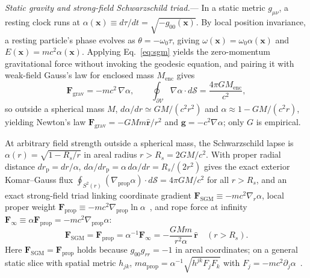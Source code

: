 \documentclass[aps,prl,reprint,superscriptaddress,nofootinbib,floatfix]{revtex4-2}
\theoremstyle{prlthm}
\newcommand{\prlsec}[1]{\par\smallskip\noindent\emph{#1.}---}
\begin{document}
\prlsec{Static gravity and strong-field Schwarzschild triad}
In a static metric $g_{\mu\nu}$, a resting clock runs at $\alpha(\mathbf{x})\equiv d\tau/dt=\sqrt{-g_{00}(\mathbf{x})}$. By local position invariance, a resting particle's phase evolves as $\theta=-\omega_0\tau$, giving $\omega(\mathbf{x})=\omega_0\alpha(\mathbf{x})$ and $E(\mathbf{x})=mc^2\alpha(\mathbf{x})$. Applying Eq.~\eqref{eq:sgm} yields the zero-momentum gravitational force without invoking the geodesic equation, and pairing it with weak-field Gauss's law for enclosed mass $M_\text{enc}$ gives
\begin{equation}
  \mathbf{F}_\text{grav}=-mc^2\,\nabla\alpha,\qquad \oint_{\partial\mathcal{V}}\nabla\alpha\cdot d\boldsymbol{\mathcal{S}}=\frac{4\pi GM_\text{enc}}{c^2},
  \label{eq:geometric_force}
\end{equation}
so outside a spherical mass $M$, $d\alpha/dr\simeq GM/(c^2 r^2)$ and $\alpha\approx 1-GM/(c^2 r)$, yielding Newton's law $\mathbf{F}_\text{grav}=-GMm\hat{\mathbf{r}}/r^2$ and $\mathbf{g}=-c^2\nabla\alpha$; only $G$ is empirical.

At arbitrary field strength outside a spherical mass, the Schwarzschild lapse is $\alpha(r)=\sqrt{1-R_s/r}$ in areal radius $r>R_s=2GM/c^2$. With proper radial distance $dr_\text{p}=dr/\alpha$, $d\alpha/dr_\text{p}=\alpha\,d\alpha/dr=R_s/(2r^2)$ gives the exact exterior Komar--Gauss flux $\oint_{S^2(r)}(\nabla_\text{prop}\alpha)\cdot d\boldsymbol{\mathcal{S}}=4\pi GM/c^2$ for all $r>R_s$, and an exact strong-field triad linking coordinate gradient $\mathbf{F}_\text{SGM}\equiv-mc^2\nabla_r\alpha$, local proper weight $\mathbf{F}_\text{prop}\equiv-mc^2\nabla_\text{prop}\ln\alpha$~\citep{Wald1984General}, and rope force at infinity $\mathbf{F}_\infty\equiv\alpha\mathbf{F}_\text{prop}=-mc^2\nabla_\text{prop}\alpha$:
\begin{equation}
  \mathbf{F}_\text{SGM}=\mathbf{F}_\text{prop}=\alpha^{-1}\mathbf{F}_\infty=-\frac{GMm}{r^2\alpha}\,\hat{\mathbf{r}}\quad(r>R_s).
  \label{eq:triad}
\end{equation}
Here $\mathbf{F}_\text{SGM}=\mathbf{F}_\text{prop}$ holds because $g_{00}g_{rr}=-1$ in areal coordinates; on a general static slice with spatial metric $h_{jk}$, $ma_\text{prop}=\alpha^{-1}\sqrt{h^{jk}F_j F_k}$ with $F_j=-mc^2\partial_j\alpha$~\citep{HutchisonWavefn2026}.
\end{document}
